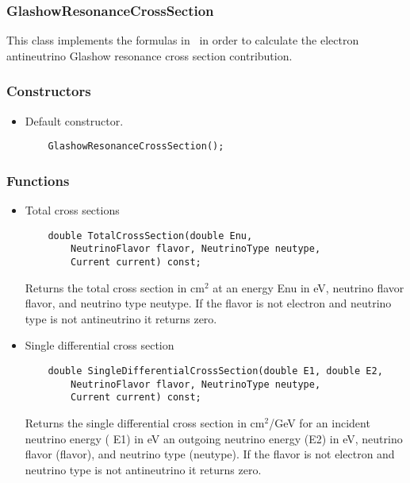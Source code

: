 \documentclass[3p,12pt]{elsarticle}
\newcommand{\ttf}{\ttfamily}
\begin{document}
\subsubsection{GlashowResonanceCrossSection\label{sec:neutrino_cross_section_glashow}}

This class implements the formulas in~\citep{Gandhi:1998ri} in order to calculate the electron antineutrino Glashow resonance cross section contribution.

\subsubsection{Constructors}

\begin{itemize}
\item Default constructor.
  \begin{lstlisting}
    GlashowResonanceCrossSection();
  \end{lstlisting}
\end{itemize}

\subsubsection{Functions}

\begin{itemize}
\item Total cross sections
  \begin{lstlisting}
    double TotalCrossSection(double Enu,
    	NeutrinoFlavor flavor, NeutrinoType neutype,
    	Current current) const;
  \end{lstlisting}
     Returns the total cross section in cm$^2$ at an energy {\ttf Enu} in eV, neutrino flavor {\ttf flavor}, and neutrino type {\ttf neutype}.
     If the flavor is not electron and neutrino type is not antineutrino it returns zero.
\item Single differential cross section
  \begin{lstlisting}
    double SingleDifferentialCrossSection(double E1, double E2,
    	NeutrinoFlavor flavor, NeutrinoType neutype,
    	Current current) const;
  \end{lstlisting}
  Returns the single differential cross section in cm$^2$/GeV for an incident neutrino energy ({\ttf
    E1}) in eV an outgoing neutrino energy ({\ttf E2}) in eV, neutrino flavor ({\ttf flavor}),
  and neutrino type ({\ttf neutype}).
     If the flavor is not electron and neutrino type is not antineutrino it returns zero.
\end{itemize}
\end{document}

